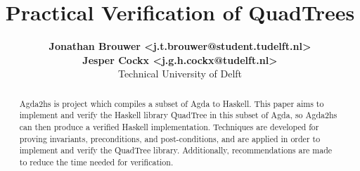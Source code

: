 \documentclass[english]{article}
\begin{document}
\title{\textbf{Practical Verification of QuadTrees}}
\author{
	\textbf{Jonathan Brouwer <j.t.brouwer@student.tudelft.nl>} \\ 
	\textbf{Jesper Cockx <j.g.h.cockx@tudelft.nl>} \\ 
	Technical University of Delft
}
\maketitle

\begin{abstract}
Agda2hs is project which compiles a subset of Agda to Haskell. This paper aims to implement and verify the Haskell library QuadTree in this subset of Agda, so Agda2hs can then produce a verified Haskell implementation. Techniques are developed for proving invariants, preconditions, and post-conditions, and are applied in order to implement and verify the QuadTree library. Additionally, recommendations are made to reduce the time needed for verification.
\end{abstract}









\newpage


\end{document}
